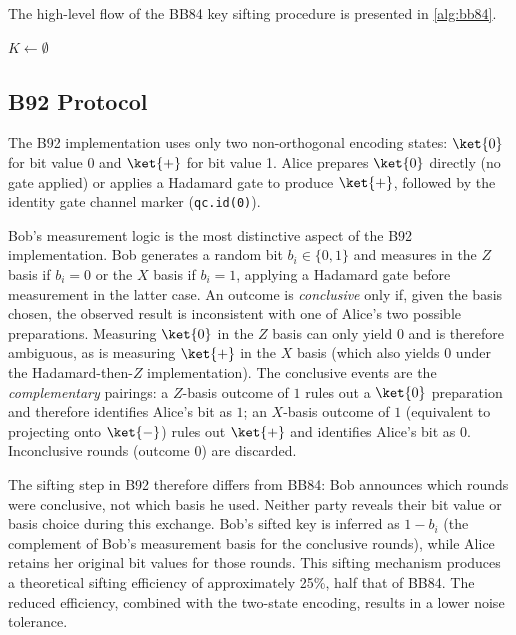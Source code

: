 The high-level flow of the BB84 key sifting procedure is presented in \cref{alg:bb84}.

\begin{algorithm}[H]
    \caption{BB84 Key Sifting Procedure}\label{alg:bb84}
    $K \leftarrow \emptyset$\;
\end{algorithm}


\subsection{B92 Protocol}

The B92 implementation uses only two non-orthogonal encoding states: $\ket{0}$ for bit value 0 and $\ket{+}$ for bit value 1. Alice prepares $\ket{0}$ directly (no gate applied) or applies a Hadamard gate to produce $\ket{+}$, followed by the identity gate channel marker (\texttt{qc.id(0)}).

Bob's measurement logic is the most distinctive aspect of the B92 implementation. Bob generates a random bit $b_i \in \{0, 1\}$ and measures in the $Z$ basis if $b_i = 0$ or the $X$ basis if $b_i = 1$, applying a Hadamard gate before measurement in the latter case. An outcome is \textit{conclusive} only if, given the basis chosen, the observed result is inconsistent with one of Alice's two possible preparations. Measuring $\ket{0}$ in the $Z$ basis can only yield $0$ and is therefore ambiguous, as is measuring $\ket{+}$ in the $X$ basis (which also yields $0$ under the Hadamard-then-$Z$ implementation). The conclusive events are the \emph{complementary} pairings: a $Z$-basis outcome of $1$ rules out a $\ket{0}$ preparation and therefore identifies Alice's bit as $1$; an $X$-basis outcome of $1$ (equivalent to projecting onto $\ket{-}$) rules out $\ket{+}$ and identifies Alice's bit as $0$. Inconclusive rounds (outcome $0$) are discarded.

The sifting step in B92 therefore differs from BB84: Bob announces which rounds were conclusive, not which basis he used. Neither party reveals their bit value or basis choice during this exchange. Bob's sifted key is inferred as $1 - b_i$ (the complement of Bob's measurement basis for the conclusive rounds), while Alice retains her original bit values for those rounds. This sifting mechanism produces a theoretical sifting efficiency of approximately 25\%, half that of BB84. The reduced efficiency, combined with the two-state encoding, results in a lower noise tolerance.

